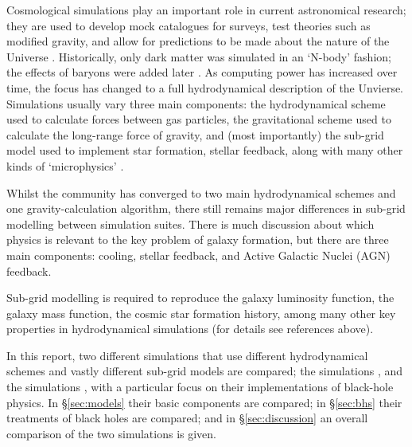 Cosmological simulations play an important role in current astronomical
research; they are used to develop mock catalogues for surveys, test theories
such as modified gravity, and allow for predictions to be made about the nature
of the Universe \citep{smith_lightcone_2017, arnold_zoomed_2016,
schaye_eagle_2015}. Historically, only dark matter was simulated in an `N-body'
fashion; the effects of baryons were added later \citep{lemson_halo_2006,
lacey_unified_2016}. As computing power has increased over time, the focus has
changed to a full hydrodynamical description of the Unvierse. Simulations
usually vary three main components: the hydrodynamical scheme used to calculate
forces between gas particles, the gravitational scheme used to calculate the
long-range force of gravity, and (most importantly) the sub-grid model used to
implement star formation, stellar feedback, along with many other kinds of
`microphysics' \citep[see e.g.][]{vogelsberger_introducing_2014,
schaye_eagle_2015, pillepich_simulating_2018}.

Whilst the community has converged to two main hydrodynamical schemes and one
gravity-calculation algorithm, there still remains major differences in
sub-grid modelling between simulation suites. There is much discussion about
which physics is relevant to the key problem of galaxy formation, but there
are three main components: cooling, stellar feedback, and Active Galactic
Nuclei (AGN) feedback.

Sub-grid modelling is required to reproduce the galaxy luminosity function,
the galaxy mass function, the cosmic star formation history, among many
other key properties in hydrodynamical simulations (for details see references
above).

In this report, two different simulations that use different hydrodynamical
schemes and vastly different sub-grid models are compared; the \hagn{}
simulations \citep{dubois_dancing_2014}, and the \fire{} simulations
\citep{hopkins_fire-2_2017}, with a particular focus on their implementations
of black-hole physics. In §\ref{sec:models} their basic components are
compared; in §\ref{sec:bhs} their treatments of black holes are compared; and
in §\ref{sec:discussion} an overall comparison of the two simulations is given. 


